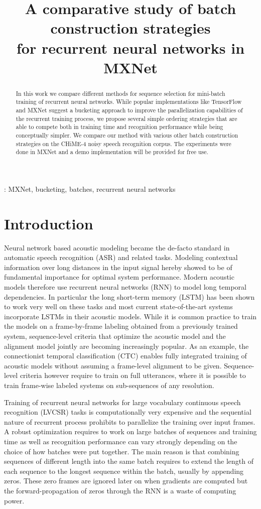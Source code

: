 \documentclass{article}
\title{A comparative study of batch construction strategies \\
	 for recurrent neural networks in MXNet}
\begin{document}
  \maketitle
  \begin{abstract}
  	 In this work we compare different methods for sequence selection for mini-batch training
  	 of recurrent neural networks. While popular implementations like TensorFlow and MXNet suggest 
  	 a bucketing approach to improve the parallelization capabilities of the recurrent training process, 
  	 we propose several simple ordering strategies that are able to compete both in training time and 
  	 recognition performance while being conceptually simpler. We compare our method with various other
  	 batch construction strategies on the CHiME-4 noisy speech recognition corpus. The experiments were
  	 done in MXNet and a demo implementation will be provided for free use.
  \end{abstract}
  : MXNet, bucketing, batches, recurrent neural networks

  \section{Introduction}
  	Neural network based acoustic modeling became the de-facto standard in automatic speech recognition (ASR)
  	and related tasks. Modeling contextual information over long distances in the input signal hereby showed to 
  	be of fundamental importance for optimal system performance. Modern acoustic models therefore use recurrent 
  	neural networks (RNN) to model long temporal dependencies. In particular the long short-term memory (LSTM)
  	has been shown to work very well on these tasks and most current state-of-the-art systems incorporate LSTMs
  	in their acoustic models. While it is common practice to train the
  	models on a frame-by-frame labeling obtained from a 
  	previously trained system, sequence-level criteria that optimize the acoustic model and the alignment model jointly
  	are becoming increasingly popular. As an example, the connectionist temporal classification (CTC) \cite{CTC}
  	enables fully integrated training of acoustic models without assuming a frame-level alignment to be given. Sequence-level
  	criteria however require to train on full utterances, where it is possible to train frame-wise labeled systems
  	on sub-sequences of any resolution.
  	
    Training of recurrent neural networks for large vocabulary continuous speech recognition (LVCSR)
    tasks is computationally very expensive and the sequential nature of recurrent process prohibits to
    parallelize the training over input frames. A robust optimization requires to work on large batches of sequences
    and training time as well as recognition performance can vary strongly depending on the choice of how
    batches were put together. The main reason is that combining sequences of different length into the same batch requires 
    to extend the length of each sequence to the longest sequence within the batch, usually by appending zeros. These zero frames 
    are ignored later on when gradients are computed but the forward-propagation of zeros through the RNN is a waste of computing power.
    
\end{document}
